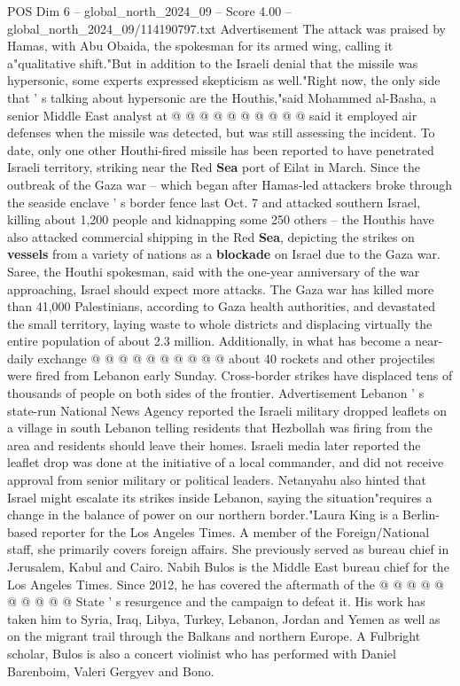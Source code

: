 \begin{textsample}{POS Dim 6 – global\_north\_2024\_09 – Score 4.00 – global\_north\_2024\_09/114190797.txt}
Advertisement The attack was praised by Hamas, with Abu Obaida, the spokesman for its armed wing, calling it a"qualitative shift."But in addition to the Israeli denial that the missile was hypersonic, some experts expressed skepticism as well."Right now, the only side that ' s talking about hypersonic are the Houthis,"said Mohammed al-Basha, a senior Middle East analyst at @ @ @ @ @ @ @ @ @ @ said it employed air defenses when the missile was detected, but was still assessing the incident.
To date, only one other Houthi-fired missile has been reported to have penetrated Israeli territory, striking near the Red \textbf{Sea} port of Eilat in March.
Since the outbreak of the Gaza war -- which began after Hamas-led attackers broke through the seaside enclave ' s border fence last Oct. 7 and attacked southern Israel, killing about 1,200 people and kidnapping some 250 others -- the Houthis have also attacked commercial shipping in the Red \textbf{Sea}, depicting the strikes on \textbf{vessels} from a variety of nations as a \textbf{blockade} on Israel due to the Gaza war.
Saree, the Houthi spokesman, said with the one-year anniversary of the war approaching, Israel should expect more attacks.
The Gaza war has killed more than 41,000 Palestinians, according to Gaza health authorities, and devastated the small territory, laying waste to whole districts and displacing virtually the entire population of about 2.3 million.
Additionally, in what has become a near-daily exchange @ @ @ @ @ @ @ @ @ @ about 40 rockets and other projectiles were fired from Lebanon early Sunday.
Cross-border strikes have displaced tens of thousands of people on both sides of the frontier.
Advertisement Lebanon ' s state-run National News Agency reported the Israeli military dropped leaflets on a village in south Lebanon telling residents that Hezbollah was firing from the area and residents should leave their homes.
Israeli media later reported the leaflet drop was done at the initiative of a local commander, and did not receive approval from senior military or political leaders.
Netanyahu also hinted that Israel might escalate its strikes inside Lebanon, saying the situation"requires a change in the balance of power on our northern border."Laura King is a Berlin-based reporter for the Los Angeles Times.
A member of the Foreign/National staff, she primarily covers foreign affairs.
She previously served as bureau chief in Jerusalem, Kabul and Cairo.
Nabih Bulos is the Middle East bureau chief for the Los Angeles Times.
Since 2012, he has covered the aftermath of the @ @ @ @ @ @ @ @ @ @ State ' s resurgence and the campaign to defeat it.
His work has taken him to Syria, Iraq, Libya, Turkey, Lebanon, Jordan and Yemen as well as on the migrant trail through the Balkans and northern Europe.
A Fulbright scholar, Bulos is also a concert violinist who has performed with Daniel Barenboim, Valeri Gergyev and Bono.

\end{textsample}
